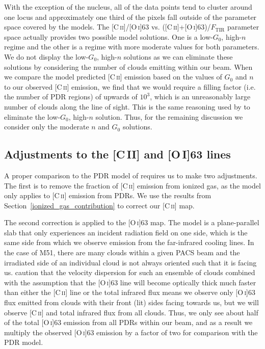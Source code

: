 \documentclass[preprint2]{aastex}
\begin{document}
With the exception of the nucleus, all of the data points tend to cluster around one locus and approximately one third of the pixels fall outside of the parameter space covered by the models.  The [C\,\textsc{ii}]/[O\,\textsc{i}]63 vs. ([C\,\textsc{ii}]+[O\,\textsc{i}]63)/$F_{\mathrm{TIR}}$ parameter space actually provides two possible model solutions.  One is a low-$G_0$, high-$n$ regime and the other is a regime with more moderate values for both parameters.  We do not display the low-$G_0$, high-$n$ solutions as we can eliminate these solutions by considering the number of clouds emitting within our beam.  When we compare the model predicted [C\,\textsc{ii}] emission based on the values of $G_0$ and $n$ to our observed [C\,\textsc{ii}] emission, we find that we would require a filling factor (i.e. the number of PDR regions) of upwards of $10^{3}$, which is an unreasonably large number of clouds along the line of sight.  This is the same reasoning used by \citet{2005A&A...441..961K} to eliminate the low-$G_0$, high-$n$ solution.  Thus, for the remaining discussion we consider only the moderate $n$ and $G_{0}$ solutions.

\subsection{Adjustments to the [C\,{\footnotesize II}] and [O\,{\footnotesize I}]63 lines}\label{pdr_model_adjustments}
A proper comparison to the PDR model of \citet{1999ApJ...527..795K} requires us to make two adjustments.  The first is to remove the fraction of [C\,\textsc{ii}] emission from ionized gas, as the model only applies to [C\,\textsc{ii}] emission from PDRs.  We use the results from Section~\ref{ionized_gas_contribution} to correct our [C\,\textsc{ii}] map.

The second correction is applied to the [O\,\textsc{i}]63 map.  The \citet{1999ApJ...527..795K} model is a plane-parallel slab that only experiences an incident radiation field on one side, which is the same side from which we observe emission from the far-infrared cooling lines.  In the case of M51, there are many clouds within a given PACS beam and the irradiated side of an individual cloud is not always oriented such that it is facing us.  \citet{1999ApJ...527..795K} caution that the velocity dispersion for such an ensemble of clouds combined with the assumption that the [O\,\textsc{i}]63 line will become optically thick much faster than either the [C\,\textsc{ii}] line or the total infrared flux means we observe only [O\,\textsc{i}]63 flux emitted from clouds with their front (lit) sides facing towards us, but we will observe [C\,\textsc{ii}] and total infrared flux from all clouds.  Thus, we only see about half of the total [O\,\textsc{i}]63 emission from all PDRs within our beam, and as a result we multiply the observed [O\,\textsc{i}]63 emission by a factor of two for comparison with the PDR model.
\end{document}
